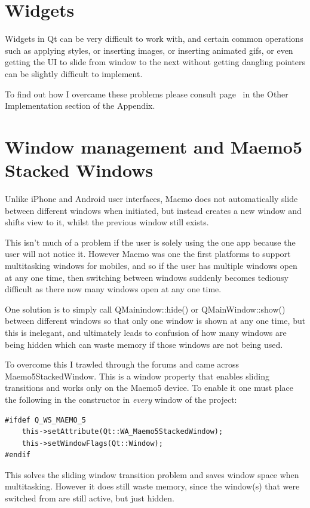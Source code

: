 \documentclass[11pt]{article} %
\begin{document}
\section{Widgets}

Widgets in Qt can be very difficult to work with, and certain common operations such as applying styles, or inserting images, or inserting animated gifs, or even getting the UI to slide from window to the next without getting dangling pointers can be slightly difficult to implement.

To find out how I overcame these problems please consult page~\pageref{widgetstuff} in the Other Implementation section of the Appendix.

\section{Window management and Maemo5 Stacked Windows}
Unlike iPhone and Android user interfaces, Maemo does not automatically slide between different windows when initiated, but instead creates a new window and shifts view to it, whilst the previous window still exists. 

This isn't much of a problem if the user is solely using the one app because the user will not notice it. However Maemo was one the first platforms to support multitasking windows for mobiles, and so if the user has multiple windows open at any one time, then switching between windows suddenly becomes tediousy difficult as there now many windows open at any one time.

One solution is to simply call QMainindow::hide() or QMainWindow::show() between different windows so that only one window is shown at any one time, but this is inelegant, and ultimately leads to confusion of how many windows are being hidden which can waste memory if those windows are not being used.

To overcome this I trawled through the forums and came across Maemo5StackedWindow. This is a window property that enables sliding transitions and works only on the Maemo5 device. To enable it one must place the following in the constructor in {\it every} window of the project:
\begin{lstlisting}
#ifdef Q_WS_MAEMO_5
    this->setAttribute(Qt::WA_Maemo5StackedWindow);
    this->setWindowFlags(Qt::Window);
#endif
\end{lstlisting}

This solves the sliding window transition problem and saves window space when multitasking. However it does still waste memory, since the window(s) that were switched from are still active, but just hidden.
\end{document}
